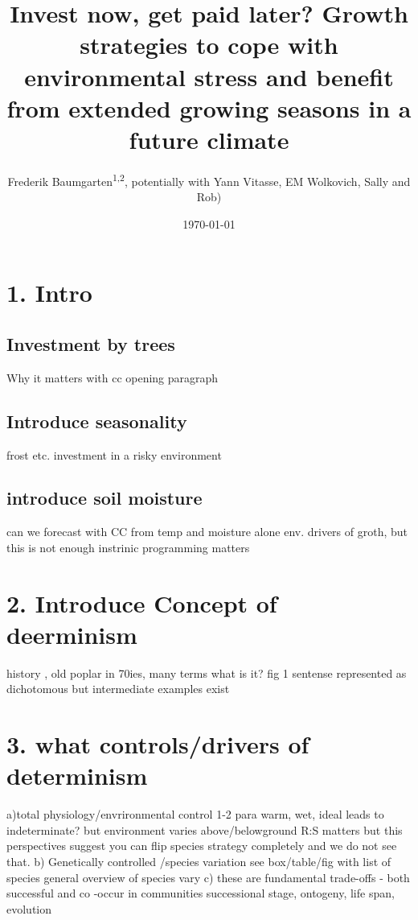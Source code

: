 \documentclass{article}
\begin{document}
	\date{\today}
	
	\title{Invest now, get paid later? Growth strategies to cope with environmental stress and benefit from extended growing seasons in a future climate}
\maketitle

\author{Frederik Baumgarten\textsuperscript{1,2}, potentially with Yann Vitasse, EM Wolkovich, Sally and Rob)}



\section{1. Intro}
\subsection{Investment by trees}
Why it matters with cc opening paragraph
\subsection{Introduce seasonality}
frost etc. investment in a risky environment
\subsection{introduce soil moisture}
can we forecast with CC from temp and moisture alone
env. drivers of groth, but this is not enough
instrinic programming matters

\section{2. Introduce Concept of deerminism}
history , old poplar in 70ies, many terms
what is it? fig
1 sentense represented as dichotomous but intermediate examples exist

\section{3. what controls/drivers of determinism}
a)total physiology/envrironmental control 1-2 para
	warm, wet, ideal leads to indeterminate?
	but environment varies above/belowground
	R:S matters
	but this perspectives suggest you can flip species strategy completely and we do not see that.
b) Genetically controlled /species variation see box/table/fig with list of species
general overview of species vary
c) these are fundamental trade-offs - both successful and co -occur in communities
successional stage, ontogeny, life span, evolution
\end{document}
